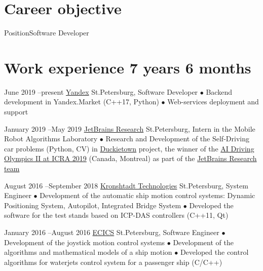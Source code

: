 \documentclass[11pt,a4paper]{moderncv}
\def\mark{{\tiny$\bullet$} }
\begin{document}
\maketitle

\section{Career objective}
\cvline
    {Position}{Software Developer}

\section{Work experience 7 years 6 months}
\cventry
    {June 2019 --\newline present}
    {\href{https://yandex.ru/}{Yandex}}
    {St.Petersburg, Software Developer}
    {}
    {}
    {
        \mark Backend development in Yandex.Market (C++17, Python)
        \newline
        \mark Web-services deployment and support
    }

\cventry
    {January 2019 --\newline May 2019}
    {\href{https://research.jetbrains.org/groups/robolab} {JetBrains Research}}
    {St.Petersburg, Intern in the Mobile Robot Algorithms Laboratory}
    {}
    {}
    {
        \mark Research and Development of the Self-Driving car problems (Python, CV) in
        {\href{https://www.duckietown.org/archives/37690}{Duckietown}} project,
        the winner of the {\href{https://www.icra2019.org/competitions/ai-driving-olympics-ai-do}
        {AI Driving Olympics II at ICRA 2019}} (Canada, Montreal) as part of the
        \href{https://research.jetbrains.org/ru/news/the-team-jbrrussia-won-ai-driving-olympics-at-icra2019}
        {JetBrains Research team}
    }

\cventry
    {August 2016 --\newline September 2018}
    {\href{https://kronshtadt.ru/}{Kronshtadt Technologies}}
    {St.Petersburg, System Engineer}
    {}
    {}
    {
        \mark Development of the automatic ship motion control systems:
              Dynamic Positioning System, Autopilot, Integrated Bridge System
        \newline
        \mark Developed the software for the test stands based on ICP-DAS controllers (C++11, Qt)
    }

\cventry
    {January 2016 --\newline August 2016}
    {\href{http://www.ec-ics.ru/}{ECICS}}
    {St.Petersburg, Software Engineer}
    {}
    {}
    {
        \mark Development of the joystick motion control systems
        \newline
        \mark Development of the algorithms and mathematical models of a ship motion
        \newline
        \mark Developed the control algorithms for waterjets control system for a passenger ship (C/C++)
    }
\end{document}
